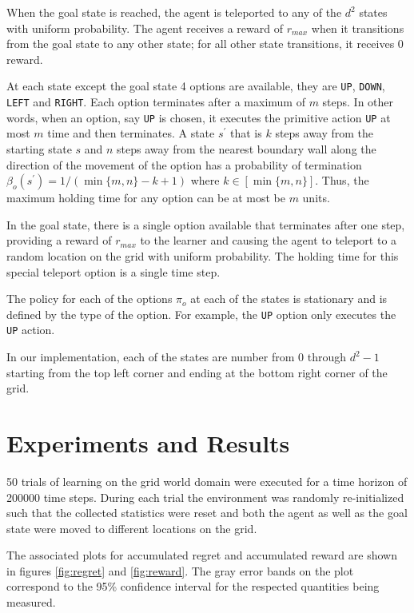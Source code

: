 When the goal state is reached, the agent is teleported to any of the $d^2$ states with uniform probability.
The agent receives a reward of $r_{max}$ when it transitions from the goal state to any other state; for all other state transitions, it receives 0 reward.

At each state except the goal state 4 options are available, they are \texttt{UP}, \texttt{DOWN}, \texttt{LEFT} and \texttt{RIGHT}.
Each option terminates after a maximum of $m$ steps. 
In other words, when an option, say \texttt{UP} is chosen, it executes the primitive action \texttt{UP} at most $m$ time and then terminates.
A state $s^\prime$ that is $k$ steps away from the starting state $s$ and $n$ steps away from the nearest boundary wall along the direction of the movement of the option has a probability of termination $\beta_o(s^\prime) = 1/(\min\{m, n\} - k + 1)$ where $k \in [\min\{m, n\}]$.
Thus, the maximum holding time for any option can be at most be $m$ units.

In the goal state, there is a single option available that terminates after one step, providing a reward of $r_{max}$ to the learner and causing the agent to teleport to a random location on the grid with uniform probability.
The holding time for this special teleport option is a single time step.

The policy for each of the options $\pi_o$ at each of the states is stationary and is defined by the type of the option.
For example, the \texttt{UP} option only executes the \texttt{UP} action.

In our implementation, each of the states are number from 0 through $d^2 - 1$ starting from the top left corner and ending at the bottom right corner of the grid.


\section{Experiments and Results}

50 trials of learning on the grid world domain were executed for a time horizon of 200000 time steps.
During each trial the environment was randomly re-initialized such that the collected statistics were reset and both the agent as well as the goal state were moved to different locations on the grid.

The associated plots for accumulated regret and accumulated reward are shown in figures \ref{fig:regret} and  \ref{fig:reward}.
The gray error bands on the plot correspond to the 95\% confidence interval for the respected quantities being measured.

